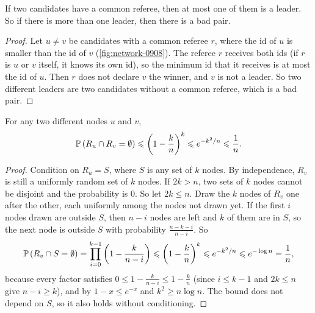 \begin{claim}\label{lem:badpair-0908}
    If two candidates have a common referee, then at most one of them is a leader. So if
    there is more than one leader, then there is a bad pair.
\end{claim}

\begin{proof}
    Let $u \neq v$ be candidates with a common referee $r$, where the id of $u$ is smaller than the
    id of $v$ (\cref{fig:network-0908}). The referee $r$ receives both ids (if $r$ is $u$ or $v$
    itself, it knows its own id), so the minimum id that it receives is at most the id of $u$. Then
    $r$ does not declare $v$ the winner, and $v$ is not a leader. So two different leaders are two
    candidates without a common referee, which is a bad pair.
\end{proof}

\begin{claim}\label{lem:disjoint-0908}
    For any two different nodes $u$ and $v$,
    \[\operatorname{\mathbb{P}}\left(R_u \cap R_v = \emptyset\right) \leqslant \left(1 - \frac{k}{n}\right)^{k}
        \leqslant e^{-k^2/n} \leqslant \frac{1}{n}.\]
\end{claim}

\begin{proof}
    Condition on $R_u = S$, where $S$ is any set of $k$ nodes. By independence, $R_v$ is still a
    uniformly random set of $k$ nodes. If $2k > n$, two sets of $k$ nodes cannot be disjoint and the
    probability is $0$. So let $2k \leq n$. Draw the $k$ nodes of $R_v$ one after the other, each
    uniformly among the nodes not drawn yet. If the first $i$ nodes drawn are outside $S$, then
    $n - i$ nodes are left and $k$ of them are in $S$, so the next node is outside $S$ with
    probability $\frac{n - k - i}{n - i}$. So
    \[\operatorname{\mathbb{P}}\left(R_v \cap S = \emptyset\right)
        = \prod_{i=0}^{k-1} \left(1 - \frac{k}{n - i}\right)
        \leqslant \left(1 - \frac{k}{n}\right)^{k}
        \leqslant e^{-k^2/n} \leqslant e^{-\log n} = \frac{1}{n},\]
    because every factor satisfies $0 \leq 1 - \frac{k}{n-i} \leq 1 - \frac{k}{n}$ (since $i \leq k - 1$
    and $2k \leq n$ give $n - i \geq k$), and by $1 - x \leq e^{-x}$ and $k^2 \geq n \log n$. The
    bound does not depend on $S$, so it also holds without conditioning.
\end{proof}

